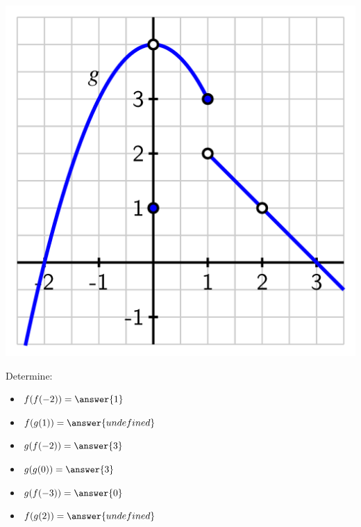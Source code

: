 \documentclass{ximera}
\begin{document}
\begin{exercise}
\begin{image}
\includegraphics{composite-ez-g.png}
\end{image}

Determine:
\begin{itemize}
\item  $f(f(-2))=\answer{1}$
\item $f(g(1))=\answer{undefined}$ 
\item $g(f(-2))=\answer{3}$
\item   $g(g(0))=\answer{3}$
\item  $g(f(-3))=\answer{0}$
\item $f(g(2))=\answer{undefined}$ 
\end{itemize}




\end{exercise}
\end{document}
